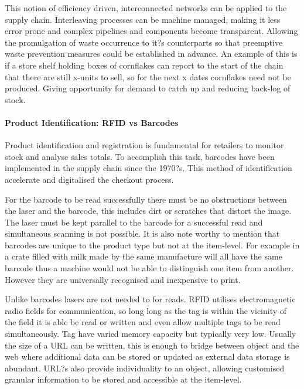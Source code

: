 \documentclass[a4paper, 11pt]{article}
\begin{document}
This notion of efficiency driven, interconnected networks can be applied to the supply chain. Interleaving processes can be machine managed, making it less error prone and complex pipelines and components become transparent. Allowing the promulgation of waste occurrence to it?s counterparts so that preemptive waste prevention measures could be established in advance. An example of this is if a store shelf holding boxes of cornflakes can report to the start of the chain that there are still x-units to sell, so for the next x dates cornflakes need not be produced. Giving opportunity for demand to catch up and reducing back-log of stock.

\paragraph{Product Identification: RFID vs Barcodes}Product identification and registration is fundamental for retailers to monitor stock and analyse sales totals. To accomplish this task, barcodes have been implemented in the supply chain since the 1970?s. This method of identification accelerate and digitalised the checkout process. 

For the barcode to be read successfully there must be no obstructions between the laser and the barcode, this includes dirt or scratches that distort the image. The laser must be kept parallel to the barcode for a successful read and simultaneous scanning is not possible. It is also note worthy to mention that barcodes are unique to the product type but not at the item-level. For example in a crate filled with milk made by the same manufacture will all have the same barcode thus a machine would not be able to distinguish one item from another. However they are universally recognised and inexpensive to print. 

Unlike barcodes lasers are not needed to for reads. RFID utilises electromagnetic radio fields for communication, so long long as the tag is within the vicinity of the field it is able be read or written and even allow multiple tags to be read simultaneously. Tag have varied memory capacity but typically very low. Usually the size of a URL can be written, this is enough to bridge between object and the web where additional data can be stored or updated as external data storage is abundant. URL?s also provide individuality to an object, allowing customised granular information to be stored and accessible at the item-level.


\vspace{\baselineskip}
\vspace{\baselineskip}
\vspace{\baselineskip}
\end{document}
